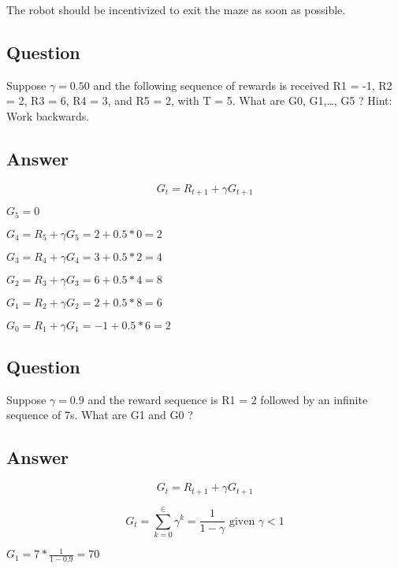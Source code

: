 \documentclass[11pt]{article}
\begin{document}
    The robot should be incentivized to exit the maze as soon as possible.

    \subsection{Question}

    Suppose $\gamma=0.5$0 and the following sequence of rewards is received R1 = -1, R2 = 2, R3 = 6, R4 = 3, and R5 = 2, with T = 5.
    What are G0, G1,\ldots, G5 ?
    Hint: Work backwards.

    \subsection*{Answer}

    \begin{equation}
        G_t = R_{t+1} + \gamma G_{t+1}
    \end{equation}

    $G_5 = 0$

    $G_4 = R_{5} + \gamma G_{5} = 2 + 0.5 * 0 = 2 $

    $G_3 = R_{4} + \gamma G_{4} = 3 + 0.5 * 2 = 4 $

    $G_2 = R_{3} + \gamma G_{3} = 6 + 0.5 * 4 = 8 $

    $G_1 = R_{2} + \gamma G_{2} = 2 + 0.5 * 8 = 6 $

    $G_0 = R_{1} + \gamma G_{1} = -1 + 0.5 * 6 = 2 $

    \subsection{Question}

    Suppose $\gamma= 0.9$ and the reward sequence is R1 = 2 followed by an infinite sequence of 7s.
    What are G1 and G0 ?

    \subsection*{Answer}

    \begin{equation}
        G_t = R_{t+1} + \gamma G_{t+1}
    \end{equation}

    \begin{equation}
        G_t = \sum_{k=0}^{\in} \gamma ^ k = \frac{1}{1-\gamma} \text{ given } \gamma < 1
    \end{equation}

    $G_1 = 7 * \frac{1}{1-0.9} = 70 $
\end{document}
